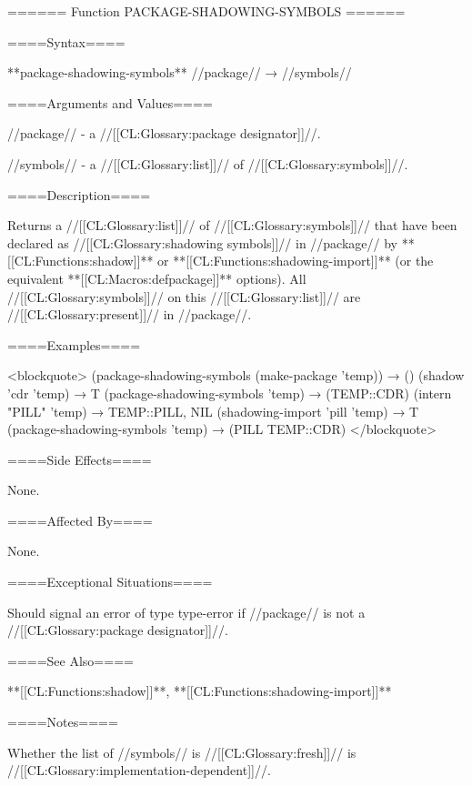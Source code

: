 ====== Function PACKAGE-SHADOWING-SYMBOLS ======

====Syntax====

**package-shadowing-symbols** //package// → //symbols//

====Arguments and Values====

//package// - a //[[CL:Glossary:package designator]]//.

//symbols// - a //[[CL:Glossary:list]]// of //[[CL:Glossary:symbols]]//.

====Description====

Returns a //[[CL:Glossary:list]]// of //[[CL:Glossary:symbols]]// that have been declared as //[[CL:Glossary:shadowing symbols]]// in //package// by **[[CL:Functions:shadow]]** or **[[CL:Functions:shadowing-import]]** (or the equivalent **[[CL:Macros:defpackage]]** options). All //[[CL:Glossary:symbols]]// on this //[[CL:Glossary:list]]// are //[[CL:Glossary:present]]// in //package//.

====Examples====

<blockquote> (package-shadowing-symbols (make-package 'temp)) → () (shadow 'cdr 'temp) → T (package-shadowing-symbols 'temp) → (TEMP::CDR) (intern "PILL" 'temp) → TEMP::PILL, NIL (shadowing-import 'pill 'temp) → T (package-shadowing-symbols 'temp) → (PILL TEMP::CDR) </blockquote>

====Side Effects====

None.

====Affected By====

None.

====Exceptional Situations====

Should signal an error of type type-error if //package// is not a //[[CL:Glossary:package designator]]//.

====See Also====

**[[CL:Functions:shadow]]**, **[[CL:Functions:shadowing-import]]**

====Notes====

Whether the list of //symbols// is //[[CL:Glossary:fresh]]// is //[[CL:Glossary:implementation-dependent]]//.

